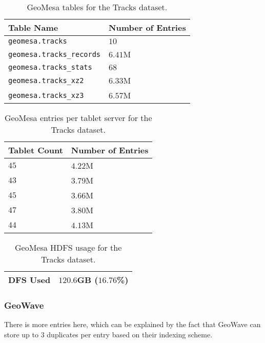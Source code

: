 \begin{table}[htb]
  \centering
  \begin{tabular}{ | l | l | }
    \hline
    Table Name & Number of Entries \\ \hline
    \texttt{geomesa.tracks} & $10$ \\
    \texttt{geomesa.tracks\_records} & $6.41$M \\
    \texttt{geomesa.tracks\_stats} & $68$ \\
    \texttt{geomesa.tracks\_xz2} & $6.33$M \\
    \texttt{geomesa.tracks\_xz3} & $6.57$M \\
    \hline
  \end{tabular}
  \caption{GeoMesa tables for the Tracks dataset.}
  \label{table:tracks:geomesa:tables}
\end{table}

\begin{table}[htb]
  \centering
  \begin{tabular}{ | l| | l | }
    \hline
    Tablet Count & Number of Entries \\ \hline
    $45$ & $4.22$M \\
    $43$ & $3.79$M \\
    $45$ & $3.66$M \\
    $47$ & $3.80$M \\
    $44$ & $4.13$M \\
    \hline
  \end{tabular}
  \caption{GeoMesa entries per tablet server for the Tracks dataset.}
  \label{table:tracks:geomesa:tablets}
\end{table}

\begin{table}[htb]
  \centering
  \begin{tabular}{ | l | l | }
    \hline
    DFS Used & $120.6$GB ($16.76$\%) \\
    \hline
  \end{tabular}
  \caption{GeoMesa HDFS usage for the Tracks dataset.}
  \label{table:tracks:geomesa:hdfs}
\end{table}

\subsubsection{GeoWave}

There is more entries here, which can be explained by the fact that GeoWave can store up to 3 duplicates per entry based on their indexing scheme.

